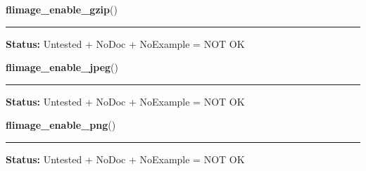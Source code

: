     \label{xformslib:library:flimage_enable_gzip}

    \vspace{0.5ex}

\hspace{.8\funcindent}\begin{boxedminipage}{\funcwidth}

    \raggedright \textbf{flimage\_enable\_gzip}()

    \vspace{-1.5ex}

    \rule{\textwidth}{0.5\fboxrule}
\setlength{\parskip}{2ex}
\setlength{\parskip}{1ex}
\textbf{Status:} Untested + NoDoc + NoExample = NOT OK



    \end{boxedminipage}

    \label{xformslib:library:flimage_enable_jpeg}

    \vspace{0.5ex}

\hspace{.8\funcindent}\begin{boxedminipage}{\funcwidth}

    \raggedright \textbf{flimage\_enable\_jpeg}()

    \vspace{-1.5ex}

    \rule{\textwidth}{0.5\fboxrule}
\setlength{\parskip}{2ex}
\setlength{\parskip}{1ex}
\textbf{Status:} Untested + NoDoc + NoExample = NOT OK



    \end{boxedminipage}

    \label{xformslib:library:flimage_enable_png}

    \vspace{0.5ex}

\hspace{.8\funcindent}\begin{boxedminipage}{\funcwidth}

    \raggedright \textbf{flimage\_enable\_png}()

    \vspace{-1.5ex}

    \rule{\textwidth}{0.5\fboxrule}
\setlength{\parskip}{2ex}
\setlength{\parskip}{1ex}
\textbf{Status:} Untested + NoDoc + NoExample = NOT OK



    \end{boxedminipage}

